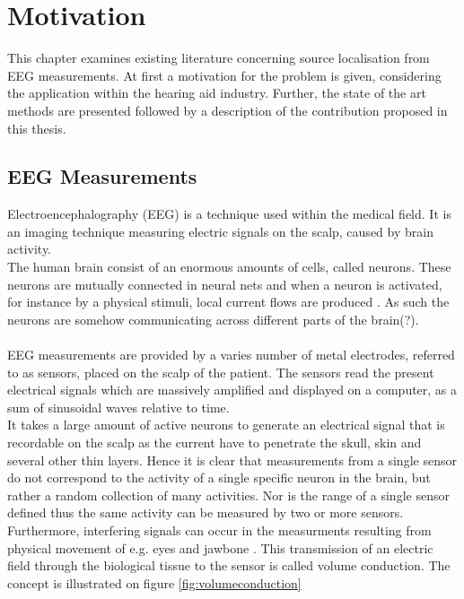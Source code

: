 \chapter{Motivation}
This chapter examines existing literature concerning source localisation from EEG measurements. At first a motivation for the problem is given, considering the application within the hearing aid industry. Further, the state of the art methods are presented followed by a description of the contribution proposed in this thesis. 

\section{EEG Measurements}
Electroencephalography (EEG) is a technique used within the medical field. It is an imaging technique measuring electric signals on the scalp, caused by brain activity. 
\\
The human brain consist of an enormous amounts of cells, called neurons. These neurons are mutually connected in neural nets and when a neuron is activated, for instance by a physical stimuli, local current flows are produced \cite{fundamentalEEG}. As such the neurons are somehow communicating across different parts of the brain(?). 
\\
\\
EEG measurements are provided by a varies number of metal electrodes, referred to as sensors, placed on the scalp of the patient. The sensors read the present electrical signals which are massively amplified and displayed on a computer, as a sum of sinusoidal waves relative to time.
\\
It takes a large amount of active neurons to generate an electrical signal that is recordable on the scalp as the current have to penetrate the skull, skin and several other thin layers.
Hence it is clear that measurements from a single sensor do not correspond to the activity of a single specific neuron in the brain, but rather a random collection of many activities. Nor is the range of a single sensor defined thus the same activity can be measured by two or more sensors. Furthermore, interfering signals can occur in the measurments resulting from physical movement of e.g. eyes and jawbone \cite{fundamentalEEG}. This transmission of an electric field through the biological tissue to the sensor is called volume conduction. The concept is illustrated on figure \ref{fig:volumeconduction}
\\
\\
